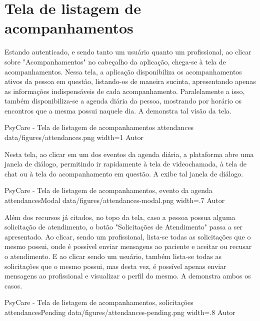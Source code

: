 \section{Tela de listagem de acompanhamentos}
\label{sec:acompanhamentos}

Estando autenticado, e sendo tanto um usuário quanto um profissional, ao clicar sobre "Acompanhamentos" no cabeçalho da aplicação, chega-se à tela de acompanhamentos. Nessa tela, a aplicação disponibiliza os acompanhamentos ativos da pessoa em questão, listando-os de maneira sucinta, apresentando apenas as informações indispensáveis de cada acompanhamento. Paralelamente a isso, também disponibiliza-se a agenda diária da pessoa, mostrando por horário os encontros que a mesma possui naquele dia. A  demonstra tal visão da tela.

\image
    {PsyCare - Tela de listagem de acompanhamentos}
    {attendances}
    {data/figures/attendances.png}
    {width=1\textwidth}
    {Autor}

Nesta tela, ao clicar em um dos eventos da agenda diária, a plataforma abre uma janela de diálogo, permitindo ir rapidamente à tela de videochamada, à tela de chat ou à tela do acompanhamento em questão. A  exibe tal janela de diálogo.

\image
    {PsyCare - Tela de listagem de acompanhamentos, evento da agenda}
    {attendancesModal}
    {data/figures/attendances-modal.png}
    {width=.7\textwidth}
    {Autor}

Além dos recursos já citados, no topo da tela, caso a pessoa possua alguma solicitação de atendimento, o botão "Solicitações de Atendimento" passa a ser apresentado. Ao clicar, sendo um profissional, lista-se todas as solicitações que o mesmo possui, onde é possível enviar mensagens ao paciente e aceitar ou recusar o atendimento. E ao clicar sendo um usuário, também lista-se todas as solicitações que o mesmo possui, mas desta vez, é possível apenas enviar mensagens ao profissional e visualizar o perfil do mesmo. A  demonstra ambos os casos.

\image
    {PsyCare - Tela de listagem de acompanhamentos, solicitações}
    {attendancesPending}
    {data/figures/attendances-pending.png}
    {width=.8\textwidth}
    {Autor}